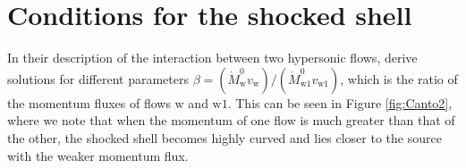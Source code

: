\documentclass{book}
\begin{document}


\section{Conditions for the shocked shell}

In their description of the interaction between two hypersonic flows,
\cite{Canto:1996} derive solutions for different parameters
$\beta=(\dot{M}^0_\mathrm{w}
v_\mathrm{w})/(\dot{M}^0_\mathrm{w1}v_\mathrm{w1})$, which is the
ratio of the momentum fluxes of flows $\mathrm{w}$ and $\mathrm{w1}$.
This can be seen in Figure \ref{fig:Canto2}, where we note that when
the momentum of one flow is much greater than that of the other, the
shocked shell becomes highly curved and lies closer to the source with
the weaker momentum flux.
\end{document}
